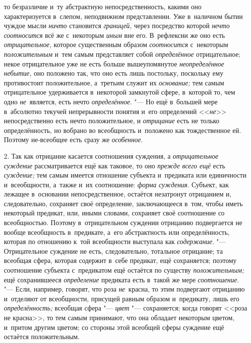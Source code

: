 то безразличие и~ту абстрактную непосредственность, какими оно характеризуется
в~слепом, неподвижном представлении. Уже в~наличном бытии чуждое мысли
{\em ничто} становится {\em границей,} через посредство которой
{\em нечто соотносится} всё же с~некоторым {\em иным} вне его. В~рефлексии же
оно есть {\em отрицательное,} которое существенным образом {\em соотносится}
с~некоторым {\em положительным} и~тем самым представляет собой
{\em определённое} отрицательное; некое отрицательное уже не есть больше
вышеупомянутое {\em неопределённое небытие,} оно положено так, что оно есть
лишь постольку, поскольку ему противостоит положительное, а~третьим служит их
{\em основание;} тем самым отрицательное удерживается в~некоторой замкнутой
сфере, в~которой то, чем одно {\em не}~является, есть нечто {\em определённое}.
"--- Но ещё в~большей мере в~абсолютно текучей непрерывности понятия и~его
определений <<{\em не}>> непосредственно есть нечто
положительное, и {\em отрицание} есть не только определённость,
но вобрано во всеобщность и~положено как тождественное ей. Поэтому
не-всеобщее есть сразу же {\em особенное}.

2. Так как отрицание касается соотношения суждения, а
{\em отрицательное суждение} рассматривается ещё как таковое, то оно
{\em прежде всего ещё} есть {\em суждение;}
тем самым имеется отношение субъекта и~предиката или
единичности и~всеобщности, а~также и~их соотношение: {\em форма суждения}.
Субъект, как лежащее в~основании непосредственное, остаётся
незатронут отрицанием и, следовательно, сохраняет своё определение,
заключающееся в~том, чтобы иметь некоторый предикат, или, иными словами,
сохраняет своё соотношение со всеобщностью. Поэтому в~отрицательном
суждении отрицанию подвергается не вообще всеобщность в~предикате, а~его
абстрактность или определённость, которая по отношению к~той всеобщности
выступала как {\em содержание}. "---
Отрицательное суждение не есть, следовательно, тотальное
отрицание; та всеобщая сфера, которая содержит в~себе предикат, ещё
сохраняется; поэтому соотношение субъекта с~предикатом ещё остаётся по
существу {\em положительным;} ещё сохранившееся {\em определение}
предиката есть в~такой же мере {\em соотношение}. "--- Если, например,
говорят, что роза {\em не}~красна, то этим подвергают отрицанию и~отделяют
от всеобщности, присущей равным образом и~предикату, лишь его
{\em определённость;} всеобщая сфера "--- {\em цвет}
"--- сохраняется; когда говорят <<роза не красна>>, то тем самым
принимают, что она обладает некоторым цветом, и~притом другим цветом; со
стороны этой всеобщей сферы суждение ещё остаётся положительным.


